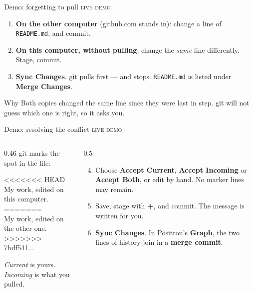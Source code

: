 \documentclass[aspectratio=169,11pt]{beamer}
\newcommand{\code}[1]{\texttt{#1}}
\newcommand{\key}[1]{\textbf{\textcolor{ban}{#1}}}
\newcommand{\ui}[1]{\textbf{#1}}
\begin{document}
\begin{frame}[t]{Demo: forgetting to pull}
  \vspace{0.3em}
  {\small\textcolor{softgray}{\textsc{live demo}}}\par\vspace{0.4em}
  \begin{enumerate}
    \item \textbf{On the other computer} {\small\textcolor{softgray}{(github.com stands in)}}: change a line of \code{README.md}, and commit.
    \item \textbf{On this computer, without pulling}: change the \emph{same} line differently. Stage, commit.
    \item \ui{Sync Changes}. git pulls first --- and stops. \code{README.md} is listed under \ui{Merge Changes}.
  \end{enumerate}
  \vfill
  \begin{block}{Why}
    Both copies changed the same line since they were last in step. git will not guess which one is right, so it asks you.
  \end{block}
\end{frame}

\begin{frame}[t]{Demo: resolving the conflict}
  \vspace{0.3em}
  {\small\textcolor{softgray}{\textsc{live demo}}}\par\vspace{0.4em}
  \begin{columns}[T]
    \begin{column}{0.46\textwidth}
      git marks the spot in the file:
      \vspace{0.4em}

      {\ttfamily\footnotesize
      \textcolor{bad}{<{}<{}<{}<{}<{}<{}< HEAD}\\
      My work, edited on this computer.\\
      \textcolor{bad}{=======}\\
      My work, edited on the other one.\\
      \textcolor{bad}{>{}>{}>{}>{}>{}>{}> 7bdf541...}\par}
      \vspace{0.6em}
      {\small \emph{Current} is yours. \emph{Incoming} is what you pulled.}
    \end{column}
    \begin{column}{0.5\textwidth}
      \begin{enumerate}
        \setcounter{enumi}{3}
        \item Choose \ui{Accept Current}, \ui{Accept Incoming} or \ui{Accept Both}, or edit by hand. No marker lines may remain.
        \item Save, stage with \ui{+}, and commit. The message is written for you.
        \item \ui{Sync Changes}. In Positron's \ui{Graph}, the two lines of history join in a \key{merge commit}.
      \end{enumerate}
    \end{column}
  \end{columns}
\end{frame}
\end{document}
